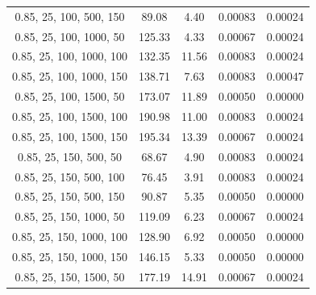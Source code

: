 \documentclass[
]{article}
\begin{document}
\begin{table}[H]
{\begin{tabular}{|c|c|c|c|c|}
                0.85, 25, 100, 500, 150    & 89.08                  & 4.40                  & 0.00083                  & 0.00024                 \\
                0.85, 25, 100, 1000, 50    & 125.33                 & 4.33                  & 0.00067                  & 0.00024                 \\
                0.85, 25, 100, 1000, 100   & 132.35                 & 11.56                 & 0.00083                  & 0.00024                 \\
                0.85, 25, 100, 1000, 150   & 138.71                 & 7.63                  & 0.00083                  & 0.00047                 \\
                0.85, 25, 100, 1500, 50    & 173.07                 & 11.89                 & 0.00050                  & 0.00000                 \\
                0.85, 25, 100, 1500, 100   & 190.98                 & 11.00                 & 0.00083                  & 0.00024                 \\
                0.85, 25, 100, 1500, 150   & 195.34                 & 13.39                 & 0.00067                  & 0.00024                 \\
                0.85, 25, 150, 500, 50     & 68.67                  & 4.90                  & 0.00083                  & 0.00024                 \\
                0.85, 25, 150, 500, 100    & 76.45                  & 3.91                  & 0.00083                  & 0.00024                 \\
                0.85, 25, 150, 500, 150    & 90.87                  & 5.35                  & 0.00050                  & 0.00000                 \\
                0.85, 25, 150, 1000, 50    & 119.09                 & 6.23                  & 0.00067                  & 0.00024                 \\
                0.85, 25, 150, 1000, 100   & 128.90                 & 6.92                  & 0.00050                  & 0.00000                 \\
                0.85, 25, 150, 1000, 150   & 146.15                 & 5.33                  & 0.00050                  & 0.00000                 \\
                0.85, 25, 150, 1500, 50    & 177.19                 & 14.91                 & 0.00067                  & 0.00024                 \\

\end{tabular}}
\end{table}
\end{document}
